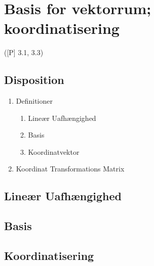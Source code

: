 \newpage
\chapter{Basis for vektorrum; koordinatisering}
([P] 3.1, 3.3)

\section*{Disposition}
\begin{enumerate}
	\item Definitioner
		\begin{enumerate}
			\item Lineær Uafhængighed
			\item Basis
			\item Koordinatvektor
		\end{enumerate}
	\item Koordinat Transformations Matrix
\end{enumerate}

\section{Lineær Uafhængighed}


\section{Basis}


\section{Koordinatisering}


\hypertarget{1.4.8}{}



